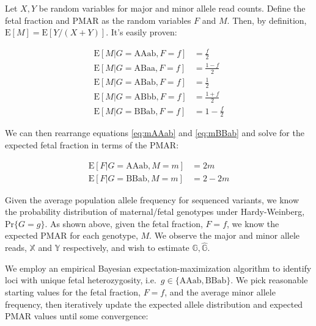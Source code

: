 \documentclass[11pt,letterpaper,oneside]{book}
\begin{document}
Let \(X,Y\) be random variables for major and minor allele read counts.
Define the fetal fraction and PMAR as the random variables \(F\) and \(M\). Then, by definition, \(\text{E}[M] = \text{E}[Y/(X + Y)]\).
It's easily proven:

\begin{align}
\text{E}[M \rvert G = \text{AAab}, F = f] &= \frac{f}{2} \label{eq:mAAab} \\
\text{E}[M \rvert G = \text{ABaa}, F = f] &= \frac{1 - f}{2} \label{eq:mABaa} \\
\text{E}[M \rvert G = \text{ABab}, F = f] &= \frac{1}{2} \label{eq:mABab} \\
\text{E}[M \rvert G = \text{ABbb}, F = f] &= \frac{1 + f}{2} \label{eq:mABbb} \\
\text{E}[M \rvert G = \text{BBab}, F = f] &= 1 - \frac{f}{2} \label{eq:mBBab} 
\end{align}

We can then rearrange equations \eqref{eq:mAAab} and \eqref{eq:mBBab} and solve for the expected fetal fraction in terms of the PMAR:

\begin{align}
\text{E}[F \rvert G = \text{AAab}, M = m] &= 2m \label{eq:fAAab} \\
\text{E}[F \rvert G = \text{BBab}, M = m] &= 2 - 2m \label{eq:fBBab} 
\end{align}

Given the average population allele frequency for sequenced variants, we know the probability distribution of maternal/fetal genotypes under Hardy-Weinberg, \(\text{Pr}\{G = g\}\).
As shown above, given the fetal fraction, \(F = f\), we know the expected PMAR for each genotype, \(M\).
We observe the major and minor allele reads, \(\mathbb{X}\) and \(\mathbb{Y}\) respectively, and wish to estimate \(\mathbb{G}, \hat{\mathbb{G}}\).

We employ an empirical Bayesian expectation-maximization algorithm to identify loci with unique fetal heterozygosity, i.e.~\(g \in \{\text{AAab}, \text{BBab}\}\).
We pick reasonable starting values for the fetal fraction, \(F = f\), and the average minor allele frequency, then iteratively update the expected allele distribution and expected PMAR values until some convergence:
\end{document}

